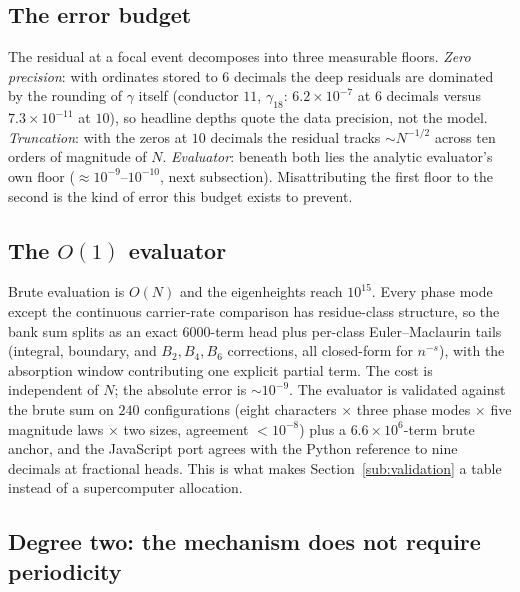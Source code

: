 \documentclass[11pt]{article}
\begin{document}
\subsection{The error budget}\label{sub:errorbudget}

The residual at a focal event decomposes into three measurable floors.  \emph{Zero precision}: with
ordinates stored to $6$ decimals the deep residuals are dominated by the rounding of $\gamma$ itself
(conductor $11$, $\gamma_{18}$: $6.2\times10^{-7}$ at $6$ decimals versus $7.3\times10^{-11}$ at
$10$), so headline depths quote the data precision, not the model.  \emph{Truncation}: with the
zeros at $10$ decimals the residual tracks $\sim N^{-1/2}$ across ten orders of magnitude of $N$.
\emph{Evaluator}: beneath both lies the analytic evaluator's own floor
($\approx10^{-9}$--$10^{-10}$, next subsection).  Misattributing the first floor to the second is
the kind of error this budget exists to prevent.

\subsection{The $O(1)$ evaluator}\label{sub:fasteval}

Brute evaluation is $O(N)$ and the eigenheights reach $10^{15}$.  Every phase mode except the
continuous carrier-rate comparison has residue-class structure, so the bank sum splits as an exact
$6000$-term head plus per-class Euler--Maclaurin tails (integral, boundary, and
$B_2,B_4,B_6$ corrections, all closed-form for $n^{-s}$), with the absorption window contributing
one explicit partial term.  The cost is independent of $N$; the absolute error is
$\sim10^{-9}$.  The evaluator is validated against the brute sum on $240$ configurations (eight
characters $\times$ three phase modes $\times$ five magnitude laws $\times$ two sizes, agreement
$<10^{-8}$) plus a $6.6\times10^{6}$-term brute anchor, and the JavaScript port agrees with the
Python reference to nine decimals at fractional heads.  This is what makes
Section~\ref{sub:validation} a table instead of a supercomputer allocation.

\subsection{Degree two: the mechanism does not require periodicity}\label{sub:gl2}
\end{document}
